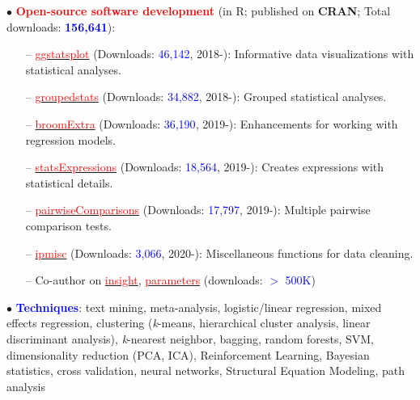 \documentclass[10pt]{article}
\begin{document}
	$\bullet$ \textcolor{red}{\textbf{Open-source software development}} (in R; published on \textbf{CRAN}; Total downloads: \textcolor{blue}{\textbf{156,641}}):
	 \vspace*{-0.09in}
	 
	\begin{itemize}
	\itemsep-0.1em
	\item[--] \href{https://indrajeetpatil.github.io/ggstatsplot/}{\textcolor{red}{ggstatsplot}} (Downloads: \textcolor{blue}{46,142}, 2018-): Informative data visualizations with statistical analyses.
	\item[--] \href{https://indrajeetpatil.github.io/groupedstats/}{\textcolor{red}{groupedstats}} (Downloads: \textcolor{blue}{34,882}, 2018-): Grouped statistical analyses.
	\item[--] \href{https://indrajeetpatil.github.io/groupedstats/}{\textcolor{red}{broomExtra}} (Downloads: \textcolor{blue}{36,190}, 2019-): Enhancements for working with regression models.
	\item[--] \href{https://indrajeetpatil.github.io/statsExpressions/}{\textcolor{red}{statsExpressions}} (Downloads: \textcolor{blue}{18,564}, 2019-): Creates expressions with statistical details.
	\item[--] \href{https://indrajeetpatil.github.io/pairwiseComparisons/}{\textcolor{red}{pairwiseComparisons}} (Downloads: \textcolor{blue}{17,797}, 2019-): Multiple pairwise comparison tests.
	\item[--] \href{https://indrajeetpatil.github.io/ipmisc/}{\textcolor{red}{ipmisc}} (Downloads: \textcolor{blue}{3,066}, 2020-): Miscellaneous functions for data cleaning.	
	\item[--] Co-author on \href{https://easystats.github.io/insight/}{\textcolor{red}{insight}}, \href{https://easystats.github.io/parameters/}{\textcolor{red}{parameters}} (downloads: \textcolor{blue}{$>$ 500K})
	\end{itemize}

	$\bullet$ \textcolor{blue}{\textbf{Techniques}}: text mining, meta-analysis, logistic/linear regression, mixed effects regression, clustering \hspace*{0.1in}(\textit{k}-means, hierarchical cluster analysis, linear discriminant analysis), \textit{k}-nearest neighbor, bagging, random \hspace*{0.1in}forests, SVM, dimensionality reduction (PCA, ICA), Reinforcement Learning, Bayesian statistics, cross \hspace*{0.1in}validation, neural networks, Structural Equation Modeling, path analysis
	\miniskip
	
\end{document}

